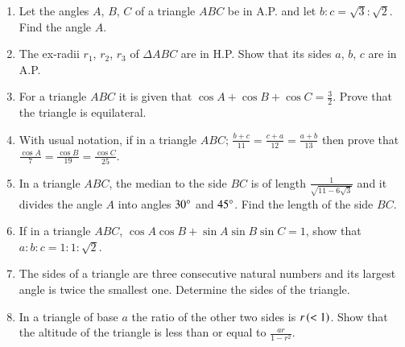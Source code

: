\begin{enumerate}[label=\thesubsection.\arabic*,ref=\thesubsection.\theenumi]
\item Let the angles $A$, $B$, $C$ of a triangle $ABC$ be in A.P. and let $b:c=\sqrt{3}:\sqrt{2}$. Find the angle $A$. 

\hfill{}

\item The ex-radii $r_1$, $r_2$, $r_3$ of $\Delta ABC$ are in H.P. Show that its sides $a$, $b$, $c$ are in A.P.

\hfill{} 

\item For a triangle $ABC$ it is given that $\cos{A}+\cos{B}+\cos{C}=\frac{3}{2}$. Prove that the triangle is equilateral. 

\hfill{}

\item With usual notation, if in a triangle $ABC$; $\frac{b+c}{11}=\frac{c+a}{12}=\frac{a+b}{13}$ then prove that $\frac{\cos{A}}{7}=\frac{\cos{B}}{19}=\frac{\cos{C}}{25}$. 

\hfill{}


\item In a triangle $ABC$, the median to the side $BC$ is of length $\frac{1}{\sqrt{11-6\sqrt{3}}}$ and it divides the angle $A$ into angles $30\degree$ and $45\degree$. Find the length of the side $BC$.

\hfill{}

\item If in a triangle $ABC$, $\cos{A}\cos{B}+\sin{A}\sin{B}\sin{C}=1$, show that $a:b:c=1:1:\sqrt{2}$.

\hfill{}

\item The sides of a triangle are three consecutive natural numbers and its largest angle is twice the smallest one. Determine the sides of the triangle.

\hfill{}

\item In a triangle of base $a$ the ratio of the other two sides is $r\left(<1\right)$. Show that the altitude of the triangle is less than or equal to $\frac{ar}{1-r^2}$.

\hfill{}


\end{enumerate}
